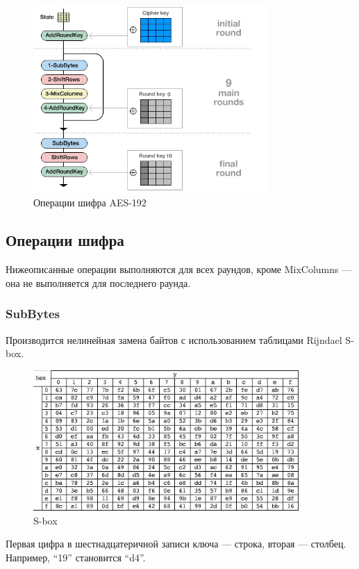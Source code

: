 \documentclass[a4paper, 14pt]{extarticle}
\begin{document}
\begin{figure}[h]
    \centering
    \includegraphics[width=0.8\textwidth]{img/S003.jpg}
    \caption{Операции шифра AES-192}
\end{figure}

\FloatBarrier{}
\subsection{Операции шифра}
Нижеописанные операции выполняются для всех раундов, кроме MixColumns --- она не выполняется для последнего раунда.
\subsubsection{SubBytes}
Производится нелинейная замена байтов с использованием таблицами Rijndael S-box.

\begin{figure}[h]
    \centering
    \includegraphics[width=0.9\textwidth]{img/S004.jpg}
    \caption{S-box}
\end{figure}
Первая цифра в шестнадцатеричной записи ключа --- строка, вторая --- столбец. Например, ``19'' становится ``d4''.
\end{document}
